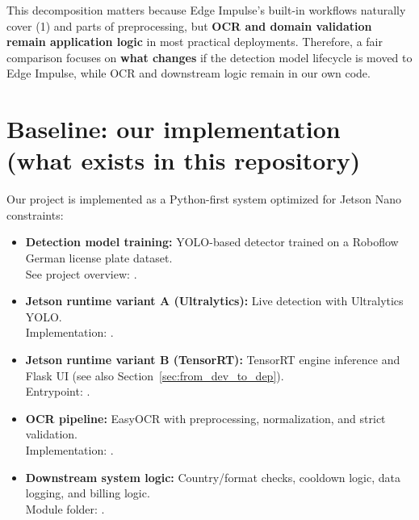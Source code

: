 \noindent
This decomposition matters because Edge Impulse's built-in workflows naturally cover (1) and parts of preprocessing, but \textbf{OCR and domain validation remain application logic} in most practical deployments.
Therefore, a fair comparison focuses on \textbf{what changes} if the detection model lifecycle is moved to Edge Impulse, while OCR and downstream logic remain in our own code.

\section{Baseline: our implementation (what exists in this repository)}
\label{sec:edge_impulse_baseline}

\noindent
Our project is implemented as a Python-first system optimized for Jetson Nano constraints:
\begin{itemize}
	\item \textbf{Detection model training:} YOLO-based detector trained on a Roboflow German license plate dataset.\\
	\noindent See project overview: .
	
	\item \textbf{Jetson runtime variant A (Ultralytics):} Live detection with Ultralytics YOLO.\\
	\noindent Implementation: .
	
	\item \textbf{Jetson runtime variant B (TensorRT):} TensorRT engine inference and Flask UI (see also Section~\ref{sec:from_dev_to_dep}).\\
	\noindent Entrypoint: .
	
	\item \textbf{OCR pipeline:} EasyOCR with preprocessing, normalization, and strict validation.\\
	\noindent Implementation: .
	
	\item \textbf{Downstream system logic:} Country/format checks, cooldown logic, data logging, and billing logic.\\
	\noindent Module folder: .
\end{itemize}

